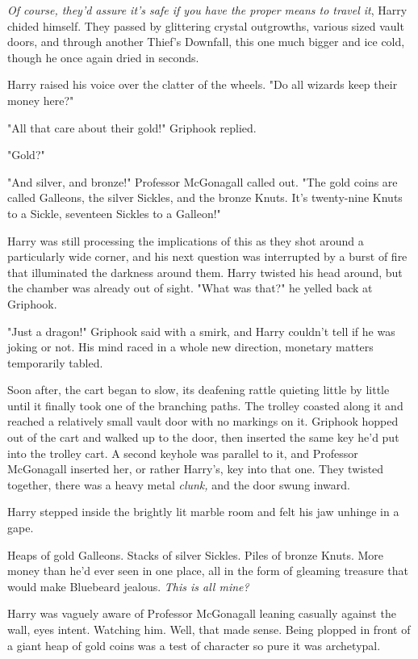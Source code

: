 \emph{Of course, they'd assure it's safe if you have the proper
means to travel it}, Harry chided himself. They passed by
glittering crystal outgrowths, various sized vault doors, and
through another Thief's Downfall, this one much bigger and
ice cold, though he once again dried in seconds.

Harry raised his voice over the clatter of the wheels. "Do
all wizards keep their money here?"

"All that care about their gold!" Griphook replied.

"Gold?"

"And silver, and bronze!" Professor McGonagall called out.
"The gold coins are called Galleons, the silver Sickles, and
the bronze Knuts. It's twenty-nine Knuts to a Sickle,
seventeen Sickles to a Galleon!"

Harry was still processing the implications of this as they
shot around a particularly wide corner, and his next
question was interrupted by a burst of fire that illuminated
the darkness around them. Harry twisted his head around,
but the chamber was already out of sight. "What was
that?" he yelled back at Griphook.

"Just a dragon!" Griphook said with a smirk, and Harry
couldn't tell if he was joking or not. His mind raced in a
whole new direction, monetary matters temporarily tabled.

Soon after, the cart began to slow, its deafening rattle
quieting little by little until it finally took one of the
branching paths. The trolley coasted along it and reached a
relatively small vault door with no markings on it. Griphook
hopped out of the cart and walked up to the door, then
inserted the same key he'd put into the trolley cart. A
second keyhole was parallel to it, and Professor McGonagall
inserted her, or rather Harry's, key into that one. They
twisted together, there was a heavy metal \emph{clunk,} and the
door swung inward.

Harry stepped inside the brightly lit marble room and felt
his jaw unhinge in a gape.

Heaps of gold Galleons. Stacks of silver Sickles. Piles of
bronze Knuts. More money than he'd ever seen in one
place, all in the form of gleaming treasure that would make
Bluebeard jealous. \emph{This{\el} is all mine?}

Harry was vaguely aware of Professor McGonagall leaning
casually against the wall, eyes intent. Watching him. Well, that made
sense. Being plopped in front of a giant heap of gold coins was a test of
character so pure it was archetypal.

